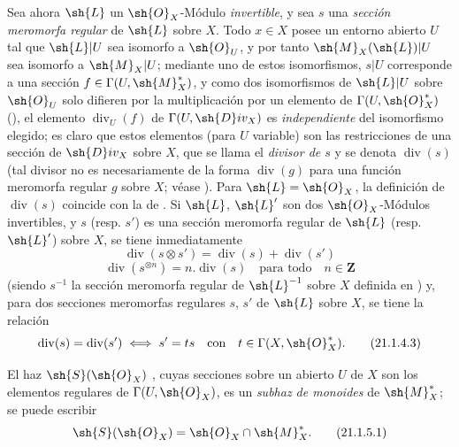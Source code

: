 \begin{env}[21.1.4]
\label{IV.21.1.4}
Sea ahora $\sh{L}$ un $\sh{O}_X$-Módulo \emph{invertible}, y sea $s$ una \emph{sección meromorfa regular}  de $\sh{L}$ sobre $X$.
Todo $x\in X$ posee un entorno abierto $U$ tal que $\sh{L}|U$ sea isomorfo a $\sh{O}_U$, y por tanto $\sh{M}_X(\sh{L})|U$ sea isomorfo a $\sh{M}_X|U$;
mediante uno de estos isomorfismos, $s|U$ corresponde a una sección $f\in\Gamma(U,\sh{M}_X^*)$, y como dos isomorfismos de $\sh{L}|U$ sobre $\sh{O}_U$ solo difieren por la multiplicación por un elemento de $\Gamma(U,\sh{O}_X^*)$ (), el elemento $\operatorname{div}_U(f)$ de $\Gamma(U,\sh{D}iv_X)$ es \emph{independiente} del isomorfismo elegido;
es claro que estos elementos (para $U$ variable) son las restricciones de una sección de $\sh{D}iv_X$ sobre $X$, que se llama el \emph{divisor de $s$} y se denota $\operatorname{div}(s)$ (tal divisor no es necesariamente de la forma $\operatorname{div}(g)$ para una función meromorfa regular $g$ sobre $X$; véase ).
Para $\sh{L}=\sh{O}_X$, la definición de $\operatorname{div}(s)$ coincide con la de .
Si $\sh{L}$, $\sh{L}'$ son dos $\sh{O}_X$-Módulos invertibles, y $s$ (resp. $s'$) es una sección meromorfa regular de $\sh{L}$ (resp. $\sh{L}'$) sobre $X$, se tiene inmediatamente
\[
\label{IV.21.1.4.1}
  \operatorname{div}(s\otimes s')=\operatorname{div}(s)+\operatorname{div}(s')
  \tag{21.1.4.1}
\]
\[
\label{IV.21.1.4.2}
  \operatorname{div}(s^{\otimes n})=n.\operatorname{div}(s) \quad\text{para todo}\quad n\in\mathbf{Z}
  \tag{21.1.4.2}
\]
(siendo $s^{-1}$ la sección meromorfa regular de $\sh{L}^{-1}$ sobre $X$ definida en )
y, para dos secciones meromorfas regulares $s$, $s'$ de $\sh{L}$ sobre $X$, se tiene la relación
\[
\label{IV.21.1.4.3}
  \operatorname{div}(s)=\operatorname{div}(s') \iff s'=ts \quad\text{con}\quad t\in\Gamma(X,\sh{O}_X^*).
  \tag{21.1.4.3}
\]
\end{env}

\begin{env}[21.1.5]
\label{IV.21.1.5}
El haz $\sh{S}(\sh{O}_X)$ , cuyas secciones sobre un abierto $U$ de $X$ son los elementos regulares de $\Gamma(U,\sh{O}_X)$, es un \emph{subhaz de monoides} de $\sh{M}_X^*$; se puede escribir
\[
\label{IV.21.1.5.1}
  \sh{S}(\sh{O}_X)=\sh{O}_X\cap\sh{M}_X^*.
  \tag{21.1.5.1}
\]
\end{env}


